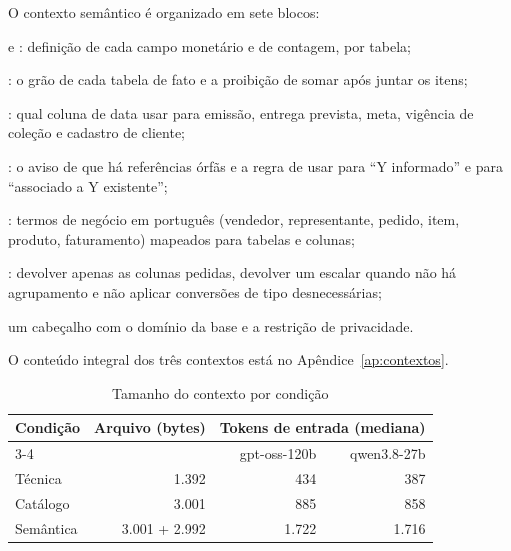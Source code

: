 O contexto semântico é organizado em sete blocos:
\begin{alineas}
  \item {} e : definição de cada campo
        monetário e de contagem, por tabela;
  \item {}: o grão de cada tabela de fato e a proibição de
        somar  após juntar os itens;
  \item {}: qual coluna de data usar para emissão,
        entrega prevista, meta, vigência de coleção e cadastro de cliente;
  \item {}: o aviso de que há referências órfãs e a
        regra de usar  para ``Y informado'' e 
        para ``associado a Y existente'';
  \item {}: termos de negócio em português (vendedor,
        representante, pedido, item, produto, faturamento) mapeados para
        tabelas e colunas;
  \item {}: devolver apenas as colunas pedidas,
        devolver um escalar quando não há agrupamento e não aplicar
        conversões de tipo desnecessárias;
  \item um cabeçalho com o domínio da base e a restrição de privacidade.
\end{alineas}
O conteúdo integral dos três contextos está no Apêndice~\ref{ap:contextos}.

\begin{table}[htb]
  \centering
  \caption{Tamanho do contexto por condição}
  \label{tab:tamanho-contexto}
  \begin{tabular}{lrrr}
    \toprule
    \multirow{2}{*}{Condição} & \multirow{2}{*}{Arquivo (bytes)} &
      \multicolumn{2}{c}{Tokens de entrada (mediana)} \\
    \cmidrule(lr){3-4}
     & & gpt-oss-120b & qwen3.8-27b \\
    \midrule
    Técnica   & 1.392 & 434 & 387 \\
    Catálogo  & 3.001 & 885 & 858 \\
    Semântica & 3.001 + 2.992 & 1.722 & 1.716 \\
    \bottomrule
  \end{tabular}
\end{table}

